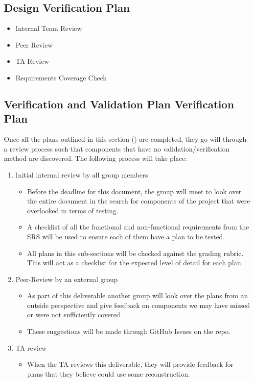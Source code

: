 \documentclass[12pt, titlepage]{article}
\begin{document}
\subsection{Design Verification Plan}

\begin{itemize}
  \item Internal Team Review
  \item Peer Review
  \item TA Review
  \item Requirements Coverage Check
\end{itemize}

\subsection{Verification and Validation Plan Verification Plan}
\label{ssub:vnv_plan_verificaiton_plan}

Once all the plans outlined in this section () are completed, they go will through a review process such that components that have no validation/verification method are discovered. The following process will take place:

\begin{enumerate}
  \item Initial internal review by all group members
        \begin{itemize}
          \item Before the deadline for this document, the group will meet to look over the entire document in the search for components of the project that were overlooked in terms of testing.
          \item A checklist of all the functional and non-functional requirements from the SRS will be used to ensure each of them have a plan to be tested.
          \item All plans in this sub-sections will be checked against the grading rubric. This will act as a checklist for the expected level of detail for each plan.
        \end{itemize}
  \item Peer-Review by an external group
        \begin{itemize}
          \item As part of this deliverable another group will look over the plans from an outside perspective and give feedback on components we may have missed or were not sufficiently covered.
          \item These suggestions will be made through GitHub Issues on the repo.
        \end{itemize}
  \item TA review
        \begin{itemize}
          \item When the TA reviews this deliverable, they will provide feedback for plans that they believe could use some reconstruction.
        \end{itemize}
\end{enumerate}
\end{document}
